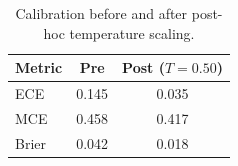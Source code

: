 \begin{table}[t]
\centering
\caption{Calibration before and after post-hoc temperature scaling.}
\label{tab:calibration}
\begin{tabular}{lcc}
\toprule
Metric & Pre & Post ($T{=}0.50$) \\
\midrule
ECE & 0.145 & 0.035 \\
MCE & 0.458 & 0.417 \\
Brier & 0.042 & 0.018 \\
\bottomrule
\end{tabular}
\end{table}
